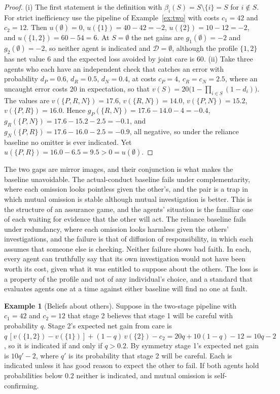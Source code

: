 \documentclass[11pt]{article}
\newcommand{\Dfc}{\mathcal D}
\theoremstyle{plain}
\theoremstyle{definition}
\newtheorem{example}{Example}
\begin{document}
\begin{proof}
(i) The first statement is the definition with $\beta_i(S)=S\setminus\{i\}=S$ for $i\notin S$. For strict inefficiency use the pipeline of Example~\ref{ex:two} with costs $c_1=42$ and $c_2=12$. Then $u(\emptyset)=0$, $u(\{1\})=40-42=-2$, $u(\{2\})=10-12=-2$, and $u(\{1,2\})=60-54=6$. At $S=\emptyset$ the net gains are $g_1(\emptyset)=-2$ and $g_2(\emptyset)=-2$, so neither agent is indicated and $\Dfc=\emptyset$, although the profile $\{1,2\}$ has net value $6$ and the expected loss avoided by joint care is $60$. (ii) Take three agents who each have an independent check that catches an error with probability $d_P=0.6$, $d_R=0.5$, $d_N=0.4$, at costs $c_P=4$, $c_R=c_N=2.5$, where an uncaught error costs $20$ in expectation, so that $v(S)=20\bigl(1-\prod_{i\in S}(1-d_i)\bigr)$. The values are $v(\{P,R,N\})=17.6$, $v(\{R,N\})=14.0$, $v(\{P,N\})=15.2$, $v(\{P,R\})=16.0$. Hence $g_P(\{R,N\})=17.6-14.0-4=-0.4$, $g_R(\{P,N\})=17.6-15.2-2.5=-0.1$, and $g_N(\{P,R\})=17.6-16.0-2.5=-0.9$, all negative, so under the reliance baseline no omitter is ever indicated. Yet $u(\{P,R\})=16.0-6.5=9.5>0=u(\emptyset)$.
\end{proof}

The two gaps are mirror images, and their conjunction is what makes the baseline unavoidable. The actual-conduct baseline fails under complementarity, where each omission looks pointless given the other's, and the pair is a trap in which mutual omission is stable although mutual investigation is better. This is the structure of an assurance game, and the agents' situation is the familiar one of each waiting for evidence that the other will act. The reliance baseline fails under redundancy, where each omission looks harmless given the others' investigations, and the failure is that of diffusion of responsibility, in which each assumes that someone else is checking. Neither failure shows bad faith. In each, every agent can truthfully say that its own investigation would not have been worth its cost, given what it was entitled to suppose about the others. The loss is a property of the profile and not of any individual's choice, and a standard that evaluates agents one at a time against either baseline will find no one at fault.

\begin{example}[Beliefs about others]\label{ex:belief}
Suppose in the two-stage pipeline with $c_1=42$ and $c_2=12$ that stage 2 believes that stage 1 will be careful with probability $q$. Stage 2's expected net gain from care is $q\,[v(\{1,2\})-v(\{1\})]+(1-q)\,v(\{2\})-c_2=20q+10(1-q)-12=10q-2$, so it is indicated if and only if $q>0.2$. By symmetry stage 1's expected net gain is $10q'-2$, where $q'$ is its probability that stage 2 will be careful. Each is indicated unless it has good reason to expect the other to fail. If both agents hold probabilities below $0.2$ neither is indicated, and mutual omission is self-confirming.
\end{example}
\end{document}
